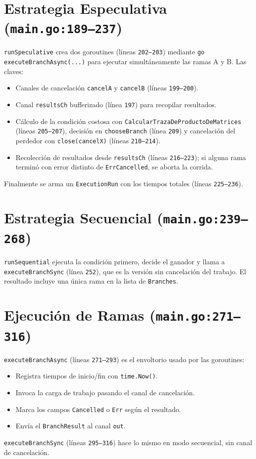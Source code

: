 \documentclass[11pt]{article}
\begin{document}
\section{Estrategia Especulativa (\texttt{main.go:189--237})}
\texttt{runSpeculative} crea dos goroutines (líneas \texttt{202--203}) mediante \texttt{go executeBranchAsync(...)} para ejecutar simultáneamente las ramas A y B. Las claves:
\begin{itemize}
  \item Canales de cancelación \texttt{cancelA} y \texttt{cancelB} (líneas \texttt{199--200}).
  \item Canal \texttt{resultsCh} bufferizado (línea \texttt{197}) para recopilar resultados.
  \item Cálculo de la condición costosa con \texttt{CalcularTrazaDeProductoDeMatrices} (líneas \texttt{205--207}), decisión en \texttt{chooseBranch} (línea \texttt{209}) y cancelación del perdedor con \texttt{close(cancelX)} (líneas \texttt{210--214}).
  \item Recolección de resultados desde \texttt{resultsCh} (líneas \texttt{216--223}); si alguna rama terminó con error distinto de \texttt{ErrCancelled}, se aborta la corrida.
\end{itemize}
Finalmente se arma un \texttt{ExecutionRun} con los tiempos totales (líneas \texttt{225--236}).

\section{Estrategia Secuencial (\texttt{main.go:239--268})}
\texttt{runSequential} ejecuta la condición primero, decide el ganador y llama a \texttt{executeBranchSync} (línea \texttt{252}), que es la versión sin cancelación del trabajo. El resultado incluye una única rama en la lista de \texttt{Branches}.

\section{Ejecución de Ramas (\texttt{main.go:271--316})}
\texttt{executeBranchAsync} (líneas \texttt{271--293}) es el envoltorio usado por las goroutines:
\begin{itemize}
  \item Registra tiempos de inicio/fin con \texttt{time.Now()}.
  \item Invoca la carga de trabajo pasando el canal de cancelación.
  \item Marca los campos \texttt{Cancelled} o \texttt{Err} según el resultado.
  \item Envía el \texttt{BranchResult} al canal \texttt{out}.
\end{itemize}
\texttt{executeBranchSync} (líneas \texttt{295--316}) hace lo mismo en modo secuencial, sin canal de cancelación.
\end{document}
